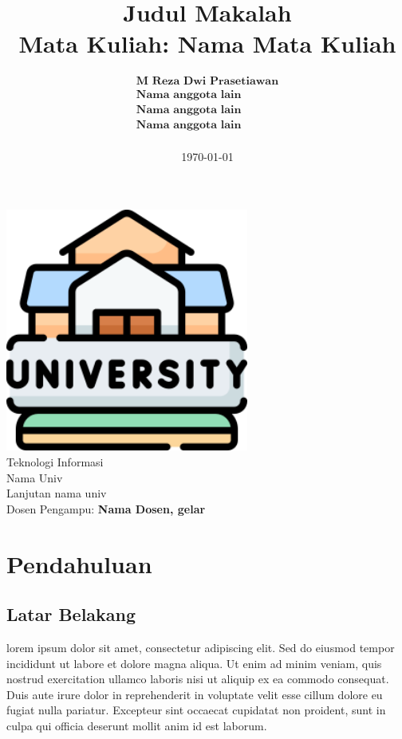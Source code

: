 \documentclass[a4paper]{article}
\title{%
  \vspace{-3cm}
  \centering
  \vspace{1cm}
  \textbf{Judul Makalah}\\
  \large Mata Kuliah: \textbf{Nama Mata Kuliah}\\
}
\author{$\begin{array}{c}
  \textbf{M Reza Dwi Prasetiawan}\\
  \textbf{Nama anggota lain}\\
  \textbf{Nama anggota lain}\\
  \textbf{Nama anggota lain}\\
\end{array}$
}
\date{\today}
\begin{document}
\begin{titlepage}
  \maketitle
  \vfill
  \begin{center}
    \includegraphics[width=0.6\textwidth]{resources/logo-univ.png}\\
    \large
    Teknologi Informasi\\
    Nama Univ\\
    Lanjutan nama univ\\
    Dosen Pengampu: \textbf{Nama Dosen, gelar}\\
  \end{center}
\end{titlepage}

\newpage
{}
\tableofcontents
\newpage
\section{Pendahuluan}
\subsection{Latar Belakang}
lorem ipsum dolor sit amet, consectetur adipiscing elit. Sed do eiusmod tempor incididunt ut labore et dolore magna aliqua. Ut enim ad minim veniam, quis nostrud exercitation ullamco laboris nisi ut aliquip ex ea commodo consequat. Duis aute irure dolor in reprehenderit in voluptate velit esse cillum dolore eu fugiat nulla pariatur. Excepteur sint occaecat cupidatat non proident, sunt in culpa qui officia deserunt mollit anim id est laborum.
\end{document}
